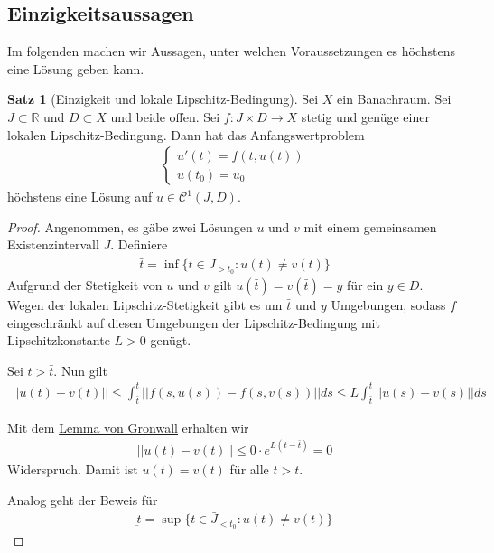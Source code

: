 \documentclass[a4paper]{article}
\theoremstyle{definition}
\newtheorem{theorem}{Satz}
\begin{document}
\subsection{Einzigkeitsaussagen}
Im folgenden machen wir Aussagen, unter welchen Voraussetzungen es höchstens eine Lösung geben kann. 

\begin{theorem}[Einzigkeit und lokale Lipschitz-Bedingung]
    Sei $X$ ein Banachraum. Sei $J \subset \mathbb{R}$ und $D \subset X$ und beide offen. Sei $f: J \times D \to X$ stetig und genüge einer lokalen Lipschitz-Bedingung. Dann hat das Anfangswertproblem
    \begin{align*}
        \begin{cases}
            u'(t) = f(t,u(t)) \\
            u(t_0) = u_0
        \end{cases}
    \end{align*}
    höchstens eine Lösung auf $u \in \mathcal C^1(J, D)$.
\end{theorem}

\begin{proof}
    Angenommen, es gäbe zwei Lösungen $u$ und $v$ mit einem gemeinsamen Existenzintervall $\bar J$. Definiere 
    \begin{align*}
        \bar t = \inf \{ t \in \bar J_{> t_0} : u(t) \neq v(t) \}
    \end{align*}
    Aufgrund der Stetigkeit von $u$ und $v$ gilt $u(\bar t) = v(\bar t) = y$ für ein $y \in D$. Wegen der lokalen Lipschitz-Stetigkeit gibt es um $\bar t$ und $y$ Umgebungen, sodass $f$ eingeschränkt auf diesen Umgebungen der Lipschitz-Bedingung mit Lipschitzkonstante $L > 0$ genügt. 
    
    Sei $t > \bar t$. Nun gilt 
    \begin{align*}
        ||u(t) - v(t)|| \leq \int^t_{\bar t} ||f(s,u(s)) - f(s, v(s))|| ds \leq L \int^t_{\bar t}||u(s) - v(s)||ds
    \end{align*}

    Mit dem \hyperref[lemma:gronwall]{Lemma von Gronwall} erhalten wir 
    \begin{align*}
        ||u(t) - v(t)|| \leq 0 \cdot e^{L(t-\bar t)} = 0
    \end{align*}
    Widerspruch. Damit ist $u(t) = v(t)$ für alle $t > \bar t$.

    Analog geht der Beweis für
    \begin{align*}
        \underbar t = \sup \{ t \in \bar J_{< t_0} : u(t) \neq v(t) \}
    \end{align*} 
\end{proof}
\end{document}
